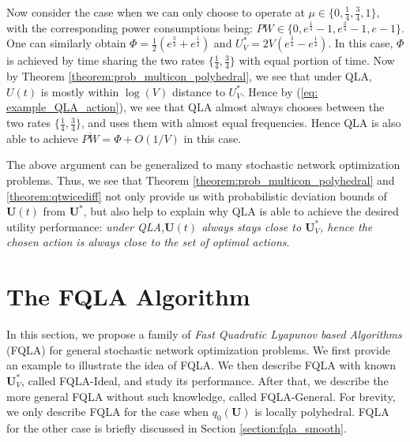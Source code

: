 \documentclass[journal]{IEEEtran}
\newcommand{\bv}[1]{{\boldsymbol{#1} }}
\begin{document}
Now consider the case when we can only choose to operate at $\mu\in\{0, \frac{1}{4}, \frac{3}{4}, 1\}$, with the corresponding power consumptions being: $PW\in\{0, e^{\frac{1}{4}}-1,e^{\frac{3}{4}}-1,e-1 \}$. One can similarly obtain $\Phi=\frac{1}{2}(e^{\frac{3}{4}}+e^{\frac{1}{4}})$ and $U^*_V=2V(e^{\frac{3}{4}}-e^{\frac{1}{4}})$. In this case, $\Phi$ is achieved by time sharing the two rates $\{\frac{1}{4}, \frac{3}{4}\}$ with equal portion of time. Now by Theorem \ref{theorem:prob_multicon_polyhedral}, we see that under QLA, $U(t)$ is mostly within $\log(V)$ distance to $U^*_V$. Hence by (\ref{eq: example_QLA_action}), we see that QLA  almost always chooses between the two rates $\{\frac{1}{4}, \frac{3}{4}\}$, and uses them with almost equal frequencies. Hence QLA is also able to achieve $\overline{PW}=\Phi+O(1/V)$ in this case. 

 

The above argument can be generalized to many stochastic network optimization problems. Thus, we see that Theorem \ref{theorem:prob_multicon_polyhedral} and \ref{theorem:qtwicediff} not only provide us with probabilistic deviation bounds of $\bv{U}(t)$ from $\bv{U}^*$, but also help to explain why QLA is able to achieve the desired utility performance:  \emph{under QLA,$\bv{U}(t)$ always stays close to $\bv{U}^*_V$, hence the chosen action is always close to the set of optimal actions}. %


\section{The FQLA Algorithm}\label{section:fqla}
In this section, we propose a family of \emph{Fast Quadratic Lyapunov based Algorithms} (FQLA) for general stochastic network optimization problems. We first provide an  example to illustrate the idea of FQLA. We then describe FQLA with known $\bv{U}_V^*$, called FQLA-Ideal, and study its performance. After that, we describe the more general FQLA without such knowledge, called FQLA-General. For brevity, we only describe FQLA for the case when $q_0(\bv{U})$ is locally polyhedral. FQLA for the other case is briefly discussed in Section \ref{section:fqla_smooth}.
\end{document}
